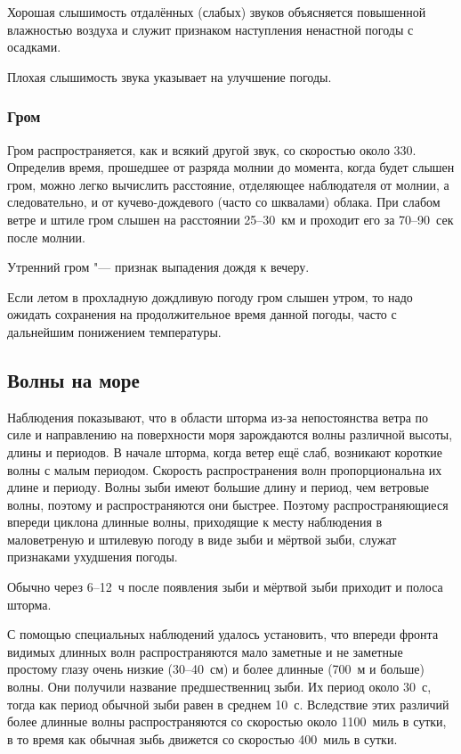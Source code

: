  Хорошая слышимость отдалённых (слабых) звуков объясняется
повышенной влажностью воздуха и служит признаком наступления ненастной
погоды с осадками.

 Плохая слышимость звука указывает на улучшение погоды.

\subsubsection{Гром}

Гром распространяется, как и всякий другой звук, со скоростью около
330\speedms. Определив время, прошедшее от разряда молнии до момента,
когда будет слышен гром, можно легко вычислить расстояние, отделяющее
наблюдателя от молнии, а следовательно, и от кучево-дождевого (часто
со шквалами) облака. При слабом ветре и штиле гром слышен на
расстоянии 25--30~км и проходит его за 70--90~сек после молнии.

 Утренний гром "--- признак выпадения дождя к вечеру.

 Если летом в прохладную дождливую погоду гром слышен утром, то
надо ожидать сохранения на продолжительное время данной погоды, часто
с дальнейшим понижением температуры.

\subsection{Волны на море}\label{sec:waves_on_sea}

Наблюдения показывают, что в области шторма из-за непостоянства ветра
по силе и направлению на поверхности моря зарождаются волны различной
высоты, длины и периодов. В начале шторма, когда ветер ещё слаб,
возникают короткие волны с малым периодом. Скорость распространения
волн пропорциональна их длине и периоду. Волны зыби имеют большие
длину и период, чем ветровые волны, поэтому и распространяются они
быстрее. Поэтому распространяющиеся впереди циклона длинные волны,
приходящие к месту наблюдения в маловетреную и штилевую погоду в виде
зыби и мёртвой зыби, служат признаками ухудшения погоды.

Обычно через 6--12~ч после появления зыби и мёртвой зыби приходит и
полоса шторма.

С помощью специальных наблюдений удалось установить, что впереди
фронта видимых длинных волн распространяются мало заметные и не
заметные простому глазу очень низкие (30--40~см) и более длинные (700~м
и больше) волны. Они получили название предшественниц зыби. Их период
около 30~с, тогда как период обычной зыби равен в среднем 10~с.
Вследствие этих различий более длинные волны распространяются со
скоростью около 1100~миль в сутки, в то время как обычная зыбь
движется со скоростью 400~миль в сутки.

